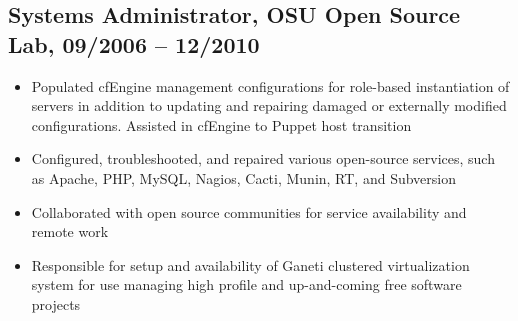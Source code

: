 \documentclass[a4paper,12pt]{report}
\begin{document}
\subsection*{Systems Administrator, OSU Open Source Lab, 09/2006 -- 12/2010}
\begin{itemize} \itemsep -0.25em
\item Populated cfEngine management configurations for role-based instantiation of servers in addition to updating and repairing damaged or externally modified configurations. Assisted in cfEngine to Puppet host transition
\item Configured, troubleshooted, and repaired various open-source services, such as Apache, PHP, MySQL, Nagios, Cacti, Munin, RT, and Subversion
\item Collaborated with open source communities for service availability and remote work
\item Responsible for setup and availability of Ganeti clustered virtualization system for use managing high profile and up-and-coming free software projects
\end{itemize}

\end{document}
